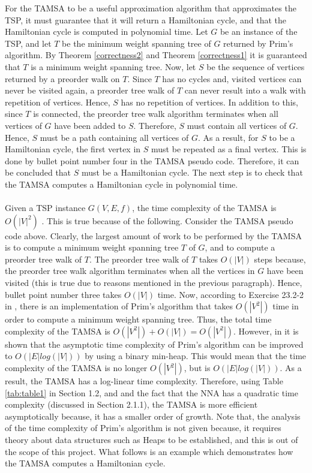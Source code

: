 \documentclass[12pt]{article}
\numberwithin{equation}{subsection}
\numberwithin{table}{subsection}
\begin{document}
For the TAMSA to be a useful approximation algorithm that approximates the TSP, it must guarantee that it will return a Hamiltonian cycle, and that the Hamiltonian cycle is computed in polynomial time. Let $G$ be an instance of the TSP, and let $T$ be the minimum weight spanning tree of $G$ returned by Prim's algorithm. By Theorem \ref{correctness2} and Theorem \ref{correctness1} it is guaranteed that $T$ is a minimum weight spanning tree. Now, let $S$ be the sequence of vertices returned by a preorder walk on $T$. Since $T$ has no cycles and, visited vertices can never be visited again, a preorder tree walk of $T$ can never result into a walk with repetition of vertices. Hence, $S$ has no repetition of vertices. In addition to this, since $T$ is connected, the preorder tree walk algorithm terminates when all vertices of $G$ have been added to $S$. Therefore, $S$ must contain all vertices of $G$. Hence, $S$ must be a path containing all vertices of $G$. As a result, for $S$ to be a Hamiltonian cycle, the first vertex in $S$ must be repeated as a final vertex. This is done by bullet point number four in the TAMSA pseudo code. Therefore, it can be concluded that $S$ must be a Hamiltonian cycle. The next step is to check that the TAMSA computes a Hamiltonian cycle in polynomial time.\\\\
Given a TSP instance $G(V,E,f)$, the time complexity of the TAMSA is $O(|V|^2)$ \cite{cormen_leiserson_rivest_stein}. This is true because of the following. Consider the TAMSA pseudo code above. Clearly, the largest amount of work to be performed by the TAMSA is to compute a minimum weight spanning tree $T$ of $G$, and to compute a preorder tree walk of $T$. The preorder tree walk of $T$ takes $O(|V|)$ steps because, the preorder tree walk algorithm terminates when all the vertices in $G$ have been visited (this is true due to reasons mentioned in the previous paragraph). Hence, bullet point number three takes $O(|V|)$ time. Now, according to Exercise 23.2-2 in \cite{cormen_leiserson_rivest_stein}, there is an implementation of Prim's algorithm that takes $O(|V^2|)$ time in order to compute a minimum weight spanning tree. Thus, the total time complexity of the TAMSA is $O(|V^2|)+ O(|V|) = O(|V^2|)$. However, in \cite{cormen_leiserson_rivest_stein} it is shown that the asymptotic time complexity of Prim's algorithm can be improved to $O(|E| log(|V|))$ by using a binary min-heap. This would mean that the time complexity of the TAMSA is no longer $O(|V^2|)$, but is $O(|E| log(|V|))$. As a result, the TAMSA has a log-linear time complexity. Therefore, using Table \ref{tab:table1} in Section 1.2, and and the fact that the NNA has a quadratic time complexity (discussed in Section 2.1.1), the TAMSA is more efficient asymptotically because, it has a smaller order of growth. Note that, the analysis of the time complexity of Prim's algorithm is not given because, it requires theory about data structures such as Heaps to be established, and this is out of the scope of this project. What follows is an example which demonstrates how the TAMSA computes a Hamiltonian cycle.
\end{document}
